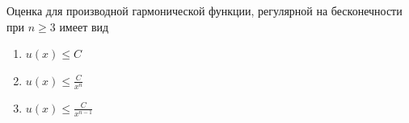 Оценка для производной гармонической функции, регулярной на бесконечности при \(n \geq 3\) имеет вид

\begin{enumerate}[label=\arabic*)]
    \item \(u(x)\leq C\)
    \item \(u(x)\leq \frac{C}{x^n}\)
    \item \(u(x)\leq \frac{C}{x^{n-1}}\)
\end{enumerate}

